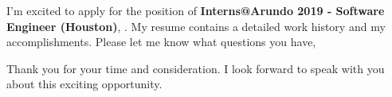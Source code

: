 \documentclass[11pt, a4paper]{ishan-cv} %
\begin{document}
\makecvheader %
\makelettertitle %


\begin{cvletter}

I’m excited to apply for the position of \textbf{Interns@Arundo 2019 - Software Engineer (Houston)}, %
. My resume contains a detailed work history and my accomplishments.
Please let me know what questions you have,

Thank you for your time and consideration. I look forward to speak with you about this exciting opportunity.

\end{cvletter}


\makeletterclosing %
\end{document}
